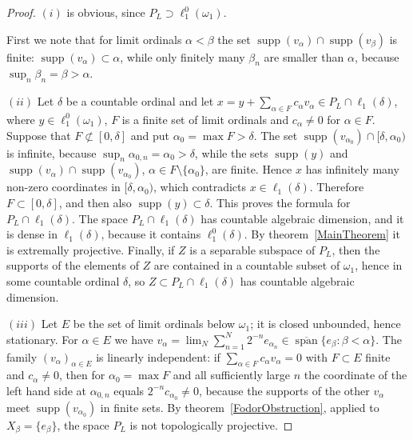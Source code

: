 \documentclass[12pt]{article}
\newcommand{\lo}[1]{\ell_1^0(#1)}
\newcommand{\ellone}[1]{\ell_1(#1)}
\newcommand{\supp}{\operatorname{supp}}
\newcommand{\Lin}{\operatorname{span}}
\begin{document}
\begin{proof} $(i)$ is obvious, since $P_L\supset\lo{\omega_1}$.

    First we note that for limit ordinals $\alpha<\beta$ the set
    $\supp(v_\alpha)\cap\supp(v_\beta)$ is finite: $\supp(v_\alpha)\subset\alpha$,
    while only finitely many $\beta_n$ are smaller than $\alpha$, because
    $\sup_n\beta_n=\beta>\alpha$.

    $(ii)$ Let $\delta$ be a countable ordinal and let
    $x=y+\sum_{\alpha\in F}c_\alpha v_\alpha\in P_L\cap\ellone{\delta}$, where
    $y\in\lo{\omega_1}$, $F$ is a finite set of limit ordinals and $c_\alpha\neq 0$
    for $\alpha\in F$. Suppose that $F\not\subset[0,\delta]$ and put
    $\alpha_0=\max F>\delta$. The set $\supp(v_{\alpha_0})\cap[\delta,\alpha_0)$
    is infinite, because $\sup_n\alpha_{0,n}=\alpha_0>\delta$, while the sets
    $\supp(y)$ and $\supp(v_\alpha)\cap\supp(v_{\alpha_0})$, $\alpha\in F\setminus\{\alpha_0\}$,
    are finite. Hence $x$ has infinitely many non-zero coordinates in
    $[\delta,\alpha_0)$, which contradicts $x\in\ellone{\delta}$. Therefore
    $F\subset[0,\delta]$, and then also $\supp(y)\subset\delta$. This proves
    the formula for $P_L\cap\ellone{\delta}$. The space $P_L\cap\ellone{\delta}$
    has countable algebraic dimension, and it is dense in $\ellone{\delta}$,
    because it contains $\lo{\delta}$. By theorem~\ref{MainTheorem} it is
    extremally projective. Finally, if $Z$ is a separable subspace of $P_L$,
    then the supports of the elements of $Z$ are contained in a countable
    subset of $\omega_1$, hence in some countable ordinal $\delta$, so
    $Z\subset P_L\cap\ellone{\delta}$ has countable algebraic dimension.

    $(iii)$ Let $E$ be the set of limit ordinals below $\omega_1$; it is
    closed unbounded, hence stationary. For $\alpha\in E$ we have
    $v_\alpha=\lim_N\sum_{n=1}^N 2^{-n}e_{\alpha_n}\in\overline{\Lin}\{e_\beta:\beta<\alpha\}$.
    The family ${(v_\alpha)}_{\alpha\in E}$ is linearly independent: if
    $\sum_{\alpha\in F}c_\alpha v_\alpha=0$ with $F\subset E$ finite and
    $c_\alpha\neq 0$, then for $\alpha_0=\max F$ and all sufficiently large
    $n$ the coordinate of the left hand side at $\alpha_{0,n}$ equals
    $2^{-n}c_{\alpha_0}\neq 0$, because the supports of the other $v_\alpha$
    meet $\supp(v_{\alpha_0})$ in finite sets. By
    theorem~\ref{FodorObstruction}, applied to $X_\beta=\{e_\beta\}$, the space
    $P_L$ is not topologically projective.
\end{proof}
\end{document}
